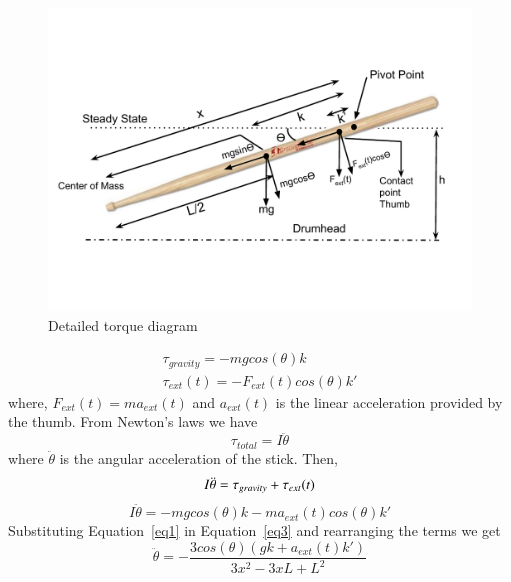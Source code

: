 \documentclass[final,1p,times]{elsarticle}
\begin{document}
\begin{figure}
	\begin{center}
		\includegraphics[width = 1\hsize]{./figures/Fig2.pdf}
		\vspace{-2.5cm}
		\caption{Detailed torque diagram}
		\label{TD}
	\end{center}
\end{figure}
\begin{gather*}
 \tau_{gravity} = -mgcos(\theta)k \\
 \tau_{ext}(t) = -F_{ext}(t)cos(\theta)k'
\end{gather*}
where, $F_{ext}(t) = ma_{ext}(t)$ and $a_{ext}(t)$ is the linear acceleration provided by the thumb. From Newton's laws we have 
\begin{equation*}
\tau_{total} = I\ddot{\theta}
\end{equation*}
where $\ddot{\theta}$ is the angular acceleration of the stick. 
Then,
\begin{equation} \label{eq2}
I\ddot{\theta} = \tau_{gravity} + \tau_{ext}(t) \\
\end{equation}
\begin{equation} \label{eq3}
I\ddot{\theta} = -mgcos(\theta)k  - ma_{ext}(t)cos(\theta)k'
\end{equation}
Substituting Equation~\ref{eq1} in Equation~\ref{eq3} and rearranging the terms we get
\begin{equation} \label{eq4}
\ddot{\theta} = -\frac{3cos(\theta)(gk + a_{ext}(t)k')}{3x^2 - 3xL + L^2}
\end{equation}
\end{document}
